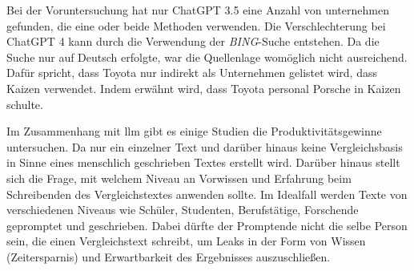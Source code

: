
Bei der Voruntersuchung hat nur ChatGPT 3.5 eine Anzahl von unternehmen gefunden, die eine oder beide Methoden verwenden. Die Verschlechterung bei ChatGPT 4 kann durch die Verwendung der \textit{BING}-Suche entstehen. Da die Suche nur auf Deutsch erfolgte, war die Quellenlage womöglich nicht ausreichend.
Dafür spricht, dass Toyota nur indirekt als Unternehmen gelistet wird, dass Kaizen verwendet. Indem erwähnt wird, dass Toyota personal Porsche in Kaizen schulte.


Im Zusammenhang mit \gls{llm} gibt es einige Studien  die Produktivitätsgewinne untersuchen. Da nur ein einzelner Text und darüber hinaus keine Vergleichsbasis in Sinne eines menschlich geschrieben Textes erstellt wird. Darüber hinaus stellt sich die Frage, mit welchem Niveau an Vorwissen und Erfahrung beim Schreibenden des Vergleichstextes anwenden sollte. Im Idealfall werden Texte von verschiedenen Niveaus wie Schüler, Studenten, Berufstätige, Forschende gepromptet und geschrieben. Dabei dürfte der Promptende nicht die selbe Person sein, die einen Vergleichstext schreibt, um Leaks in der Form von Wissen (Zeitersparnis) und Erwartbarkeit des Ergebnisses auszuschließen.

